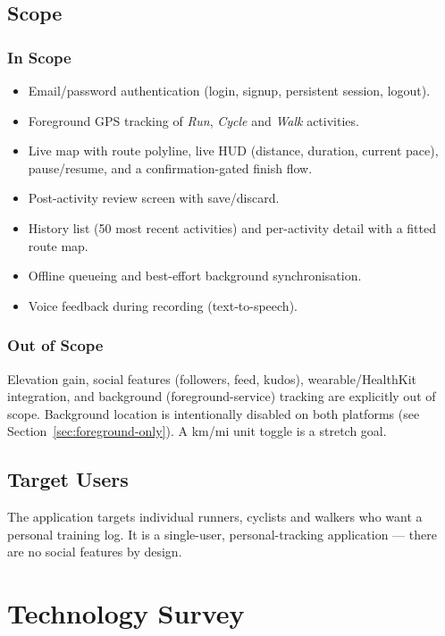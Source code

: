 \documentclass[11pt,a4paper]{report}
\begin{document}
\section{Scope}
\subsection{In Scope}
\begin{itemize}[nosep]
    \item Email/password authentication (login, signup, persistent session, logout).
    \item Foreground GPS tracking of \textit{Run}, \textit{Cycle} and \textit{Walk} activities.
    \item Live map with route polyline, live HUD (distance, duration, current pace), pause/resume, and a confirmation-gated finish flow.
    \item Post-activity review screen with save/discard.
    \item History list (50 most recent activities) and per-activity detail with a fitted route map.
    \item Offline queueing and best-effort background synchronisation.
    \item Voice feedback during recording (text-to-speech).
\end{itemize}

\subsection{Out of Scope}
Elevation gain, social features (followers, feed, kudos), wearable/HealthKit integration, and background (foreground-service) tracking are explicitly out of scope. Background location is intentionally disabled on both platforms (see Section~\ref{sec:foreground-only}). A km/mi unit toggle is a stretch goal.

\section{Target Users}
The application targets individual runners, cyclists and walkers who want a personal training log. It is a single-user, personal-tracking application --- there are no social features by design.

\chapter{Technology Survey}
\end{document}
